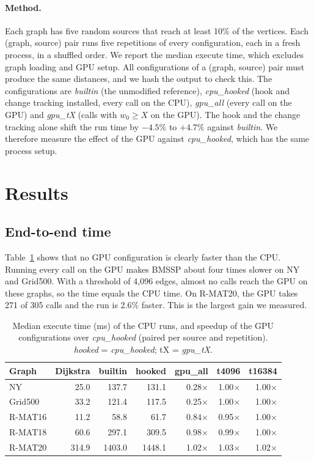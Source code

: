 \documentclass[conference]{IEEEtran}
\begin{document}
\paragraph{Method.} Each graph has five random sources that reach at least 10\% of the vertices. Each (graph, source)
pair runs five repetitions of every configuration, each in a fresh process, in a shuffled order. We report the median
execute time, which excludes graph loading and GPU setup. All configurations of a (graph, source) pair must produce the
same distances, and we hash the output to check this. The configurations are \emph{builtin} (the unmodified reference),
\emph{cpu\_hooked} (hook and change tracking installed, every call on the CPU), \emph{gpu\_all} (every call on the GPU)
and \emph{gpu\_tX} (calls with $w_0 \ge X$ on the GPU). The hook and the change tracking alone shift the run time by
$-4.5\%$ to $+4.7\%$ against \emph{builtin}. We therefore measure the effect of the GPU against \emph{cpu\_hooked},
which has the same process setup.

\section{Results}

\subsection{End-to-end time}

Table~\ref{tab:e2e} shows that no GPU configuration is clearly faster than the CPU. Running every call on the GPU makes
BMSSP about four times slower on NY and Grid500. With a threshold of 4{,}096 edges, almost no calls reach the GPU on
these graphs, so the time equals the CPU time. On R-MAT20, the GPU takes 271 of 305 calls and the run is 2.6\% faster.
This is the largest gain we measured.

\begin{table}[t]
\centering
\footnotesize\setlength{\tabcolsep}{3pt}
\caption{Median execute time (ms) of the CPU runs, and speedup of the GPU configurations over \emph{cpu\_hooked}
(paired per source and repetition). \emph{hooked} = \emph{cpu\_hooked}; tX = \emph{gpu\_tX}.}
\label{tab:e2e}
\begin{tabular}{lrrrrrr}
\toprule
Graph & Dijkstra & builtin & hooked & gpu\_all & t4096 & t16384 \\
\midrule
NY & 25.0 & 137.7 & 131.1 & 0.28$\times$ & 1.00$\times$ & 1.00$\times$ \\
Grid500 & 33.2 & 121.4 & 117.5 & 0.25$\times$ & 1.00$\times$ & 1.00$\times$ \\
R-MAT16 & 11.2 & 58.8 & 61.7 & 0.84$\times$ & 0.95$\times$ & 1.00$\times$ \\
R-MAT18 & 60.6 & 297.1 & 309.5 & 0.98$\times$ & 0.99$\times$ & 1.00$\times$ \\
R-MAT20 & 314.9 & 1403.0 & 1448.1 & 1.02$\times$ & 1.03$\times$ & 1.02$\times$ \\
\bottomrule
\end{tabular}
\end{table}
\end{document}
